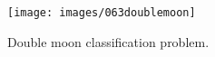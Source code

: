 \begin{figure}[!h]
\centering
\texttt{[image: images/063doublemoon]}
\caption[Double moon classification problem]{Double moon classification
problem.}
\label{fig:063doublemoon}
\end{figure}